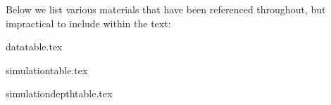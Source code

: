 \documentclass[class=article, crop=false]{standalone}
\begin{document}
	Below we list various materials that have been referenced throughout, but impractical to include within the text:

	{datatable.tex}

	{simulationtable.tex}

	{simulationdepthtable.tex}
\end{document}
